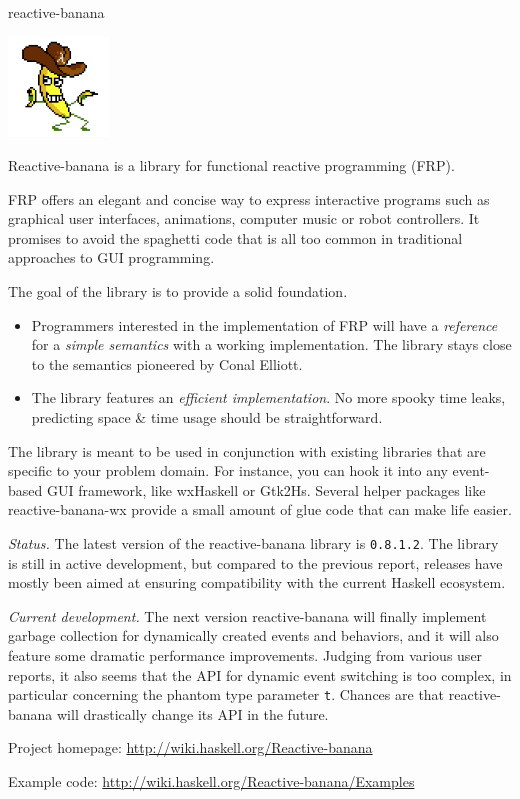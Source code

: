 \begin{hcarentry}[updated]{reactive-banana}
\makeheader

\begin{center}
\includegraphics[width=0.2\textwidth]{html/banana.jpg}
\end{center}

Reactive-banana is a library for functional reactive programming (FRP).

FRP offers an elegant and concise way to express interactive programs such as graphical user interfaces, animations, computer music or robot controllers. It promises to avoid the spaghetti code that is all too common in traditional approaches to GUI programming.

The goal of the library is to provide a solid foundation.
\begin{itemize}
\item Programmers interested in the implementation of FRP will have a \emph{reference} for a \emph{simple semantics} with a working implementation. The library stays close to the semantics pioneered by Conal Elliott.
\item The library features an \emph{efficient implementation}. No more spooky time leaks, predicting space \& time usage should be straightforward.
\end{itemize}

The library is meant to be used in conjunction with existing libraries that are specific to your problem domain. For instance, you can hook it into any event-based GUI framework, like wxHaskell or Gtk2Hs. Several helper packages like reactive-banana-wx provide a small amount of glue code that can make life easier.

\emph{Status.} The latest version of the reactive-banana library is \verb!0.8.1.2!. The library is still in active development, but compared to the previous report, releases have mostly been aimed at ensuring compatibility with the current Haskell ecosystem.

\emph{Current development.}
The next version reactive-banana will finally implement garbage collection for dynamically created events and behaviors, and it will also feature some dramatic performance improvements. Judging from various user reports, it also seems that the API for dynamic event switching is too complex, in particular concerning the phantom type parameter \verb`t`. Chances are that reactive-banana will drastically change its API in the future.

\FurtherReading
\begin{compactitem}
\item Project homepage: \url{http://wiki.haskell.org/Reactive-banana}
\item Example code: \url{http://wiki.haskell.org/Reactive-banana/Examples}
\end{compactitem}
\end{hcarentry}
